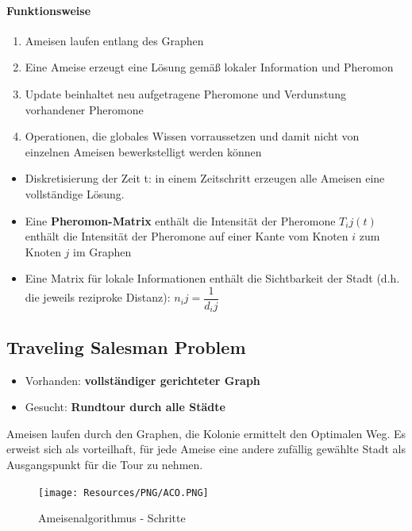\paragraph{Funktionsweise}
\begin{enumerate}
	\item Ameisen laufen entlang des Graphen
	\item Eine Ameise erzeugt eine Lösung gemäß lokaler Information und Pheromon
	\item Update beinhaltet neu aufgetragene Pheromone und Verdunstung
		vorhandener Pheromone
	\item Operationen, die globales Wissen vorraussetzen und damit nicht von
		einzelnen Ameisen bewerkstelligt werden können
\end{enumerate}
\begin{itemize}
	\item Diskretisierung der Zeit t: in einem Zeitschritt erzeugen alle Ameisen
		eine vollständige Lösung.
	\item Eine \textbf{Pheromon-Matrix} enthält die  Intensität der Pheromone
		$T_ij(t)$ enthält die Intensität der Pheromone auf einer Kante vom Knoten
		$i$ zum Knoten $j$ im Graphen
	\item Eine Matrix für lokale Informationen enthält die Sichtbarkeit der Stadt
		(d.h. die jeweils reziproke Distanz): $n_ij = \dfrac{1 }{d_ij}$
\end{itemize}

\subsection{Traveling Salesman Problem}
\begin{itemize}
	\item Vorhanden: \textbf{vollständiger gerichteter Graph}
	\item Gesucht: \textbf{Rundtour durch alle Städte}
\end{itemize}
Ameisen laufen durch den Graphen, die Kolonie ermittelt den Optimalen Weg.
Es erweist sich als vorteilhaft, für jede Ameise eine andere zufällig gewählte
Stadt als Ausgangspunkt für die Tour zu nehmen.

\begin{figure}[H]
	\begin{center}
		\texttt{[image: Resources/PNG/ACO.PNG]}
		\caption{Ameisenalgorithmus - Schritte}
		\label{fig:PNG/ACO.PNG}
	\end{center}
\end{figure}

